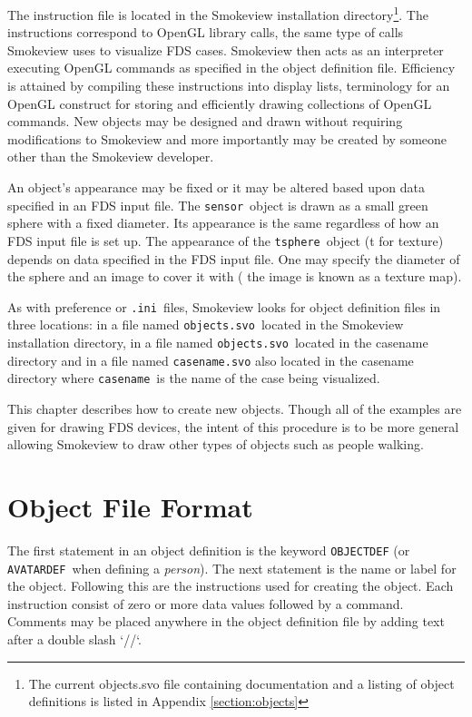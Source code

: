 \documentclass[11pt,twoside]{book}
\begin{document}
The instruction file is located in the Smokeview installation directory\footnote{The current objects.svo file containing documentation and a listing of object definitions is listed in Appendix \ref{section:objects}}. The instructions correspond to OpenGL library calls, the same type of calls Smokeview uses to visualize FDS cases. Smokeview then acts as an interpreter executing OpenGL commands as specified in the object definition file. Efficiency is attained by compiling these instructions into display lists, terminology for an OpenGL construct for storing and efficiently drawing collections of OpenGL commands.  New objects may be designed and drawn without requiring modifications to Smokeview and more importantly may be created by someone other than the Smokeview developer.

An object's appearance may be fixed or it may be altered based upon data specified in an FDS input file.  The {\tt sensor}\ object is drawn as a small green sphere with a fixed diameter.  Its appearance is the same regardless of how an FDS input file is set up. The appearance of the {\tt tsphere}\ object (t for texture) depends on data specified in the FDS input file.  One may specify the diameter of the sphere and an image to cover it with ( the image is known as a texture map).

As with preference or {\tt .ini}\ files, Smokeview looks for object definition files in three locations: in a file named {\tt objects.svo}\ located in the Smokeview installation directory, in a file named {\tt objects.svo}\ located in the casename directory and in a file named {\tt casename.svo} also located in the casename directory where {\tt casename}\ is the name of the case being visualized.

This chapter describes how to create new objects. Though all of the examples are given for drawing FDS devices, the intent of this procedure is to be more general allowing Smokeview to draw other types of objects such as people walking.

\section{Object File Format}
The first statement in an object definition is the keyword {\tt OBJECTDEF} (or {\tt AVATARDEF}\ when defining a {\em person}). The next statement is the name or label for the object. Following this are the instructions used for creating the object. Each instruction consist of zero or more data values followed by a command. Comments may be placed anywhere in the object definition file by adding text after a double slash `//`.
\end{document}
